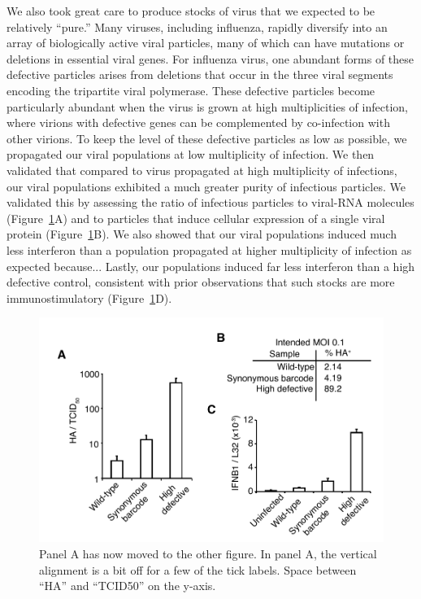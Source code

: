 \documentclass[9pt,lineno]{elife}
\begin{document}
We also took great care to produce stocks of virus that we expected to be relatively ``pure.''
Many viruses, including influenza, rapidly diversify into an array of biologically active viral particles, many of which can have mutations or deletions in essential viral genes.
For influenza virus, one abundant forms of these defective particles arises from deletions that occur in the three viral segments encoding the tripartite viral polymerase.
These defective particles become particularly abundant when the virus is grown at high multiplicities of infection, where virions with defective genes can be complemented by co-infection with other virions.
To keep the level of these defective particles as low as possible, we propagated our viral populations at low multiplicity of infection.
We then validated that compared to virus propagated at high multiplicity of infections, our viral populations exhibited a much greater purity of infectious particles.
We validated this by assessing the ratio of infectious particles to viral-RNA molecules (Figure~\ref{fig:viruspopulations}A) and to particles that induce cellular expression of a single viral protein (Figure~\ref{fig:viruspopulations}B).
We also showed that our viral populations induced much less interferon than a population propagated at higher multiplicity of infection as expected because...
Lastly, our populations induced far less interferon than a high defective control, consistent with prior observations that such stocks are more immunostimulatory (Figure~\ref{fig:viruspopulations}D).

\begin{figure}
\includegraphics[width=0.7\linewidth]{figures/Validating_barcode_virus/validating_populations_D02.pdf}
\caption{\label{fig:viruspopulations}
Panel A has now moved to the other figure.
In panel A, the vertical alignment is a bit off for a few of the tick labels.
Space between ``HA'' and ``TCID50'' on the y-axis.}
\end{figure}
\end{document}
